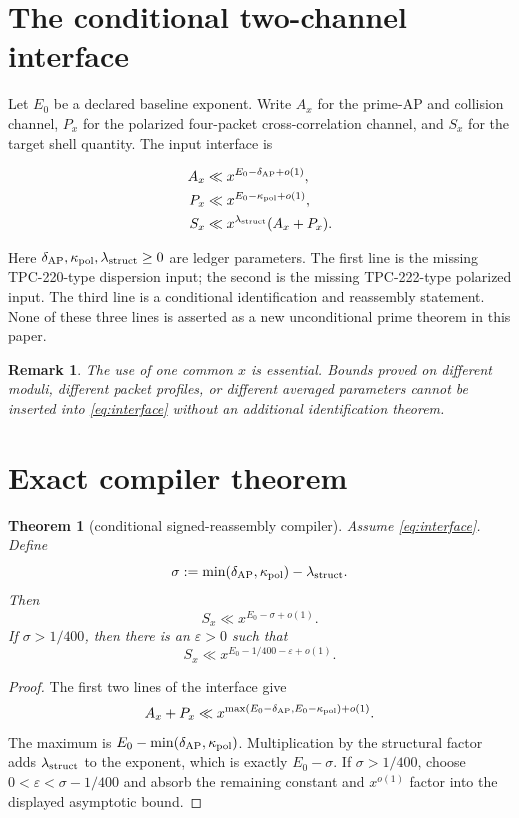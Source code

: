 \documentclass[11pt]{article}
\newtheorem{theorem}{Theorem}
\newtheorem{remark}{Remark}
\begin{document}
\section{The conditional two-channel interface}

Let $E_0$ be a declared baseline exponent.  Write $A_x$ for the prime-AP and
collision channel, $P_x$ for the polarized four-packet cross-correlation
channel, and $S_x$ for the target shell quantity.  The input interface is

\begin{align}
 A_x &\ll x^{E_0-\delta_{\rm AP}+o(1)}, \label{eq:interface}\\
 P_x &\ll x^{E_0-\kappa_{\rm pol}+o(1)}, \\
 S_x &\ll x^{\lambda_{\rm struct}}(A_x+P_x).
\end{align}

Here $\delta_{\rm AP},\kappa_{\rm pol},\lambda_{\rm struct}\geq 0$ are
ledger parameters.  The first line is the missing TPC-220-type dispersion
input; the second is the missing TPC-222-type polarized input.  The third line
is a conditional identification and reassembly statement.  None of these
three lines is asserted as a new unconditional prime theorem in this paper.

\begin{remark}
The use of one common $x$ is essential.  Bounds proved on different moduli,
different packet profiles, or different averaged parameters cannot be inserted
into \eqref{eq:interface} without an additional identification theorem.
\end{remark}

\section{Exact compiler theorem}

\begin{theorem}[conditional signed-reassembly compiler]
Assume \eqref{eq:interface}.  Define
\[
 \sigma:=\min(\delta_{\rm AP},\kappa_{\rm pol})-\lambda_{\rm struct}.
\]
Then
\[
 S_x\ll x^{E_0-\sigma+o(1)}.
 \label{eq:compiled}
\]
If $\sigma>1/400$, then there is an $\varepsilon>0$ such that
\[
 S_x\ll x^{E_0-1/400-\varepsilon+o(1)}.
\]
\end{theorem}

\begin{proof}
The first two lines of the interface give
\[
 A_x+P_x\ll
 x^{\max(E_0-\delta_{\rm AP},E_0-\kappa_{\rm pol})+o(1)}.
\]
The maximum is $E_0-\min(\delta_{\rm AP},\kappa_{\rm pol})$.
Multiplication by the structural factor adds
$\lambda_{\rm struct}$ to the exponent, which is exactly
$E_0-\sigma$.  If $\sigma>1/400$, choose
$0<\varepsilon<\sigma-1/400$ and absorb the remaining constant and
$x^{o(1)}$ factor into the displayed asymptotic bound.
\end{proof}
\end{document}
